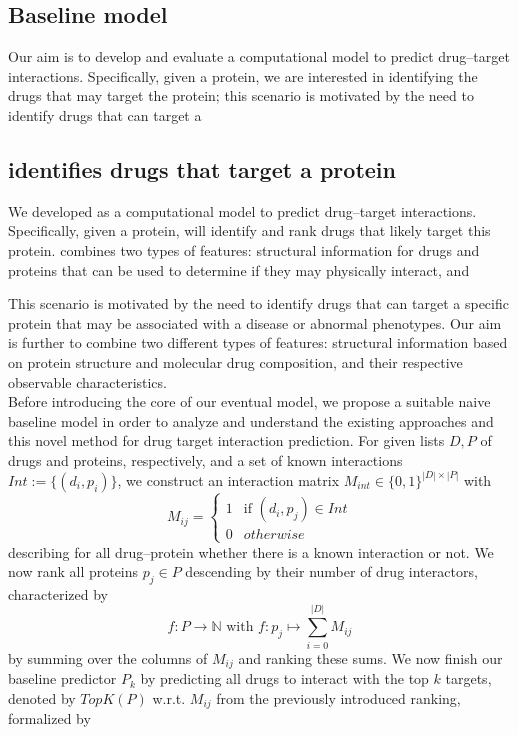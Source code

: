 \documentclass{bioinfo}
\begin{document}
\subsection{Baseline model}
Our aim is to develop and evaluate a computational model to predict
drug--target interactions. Specifically, given a protein, we are
interested in identifying the drugs that may target the protein; this
scenario is motivated by the need to identify drugs that can target a

\subsection{\name identifies drugs that target a protein}

We developed \name as a computational model to predict drug--target
interactions. Specifically, given a protein, \name will identify and
rank drugs that likely target this protein. \name combines two 
types of features: structural information for drugs and proteins that
can be used to determine if they may physically interact, and 

This scenario is motivated by the need to identify drugs that can target a
specific protein that may be associated with a disease or abnormal
phenotypes.
Our aim is further to combine two different types of features:
structural information based on protein structure and molecular drug composition, and their respective observable characteristics. \\

Before introducing the core of our eventual model, we propose a suitable naive baseline model in order to analyze and understand the existing approaches and this novel method for drug target interaction prediction. For given lists $D, P$ of drugs and proteins, respectively, and a set of known interactions $Int := \{(d_i, p_i) \}$, we construct an interaction matrix $M_{int}\in\{0,1\}^{|D|\times|P|}$ with 
\begin{equation*}
	M_{ij} = \begin{cases}
		1 & \text{if } (d_i, p_j)\in Int\\
		0 & otherwise
	\end{cases}
\end{equation*}
describing for all drug--protein whether there is a known interaction or not. We now rank all proteins $p_j\in P$ descending by their number of drug interactors, characterized by 
\begin{equation*}
	f: P \rightarrow \mathbb{N} \text{ with } f:p_j \mapsto \sum_{i=0}^{|D|}M_{ij}
\end{equation*}
by summing over the columns of $M_{ij}$ and ranking these sums.
We now finish our baseline predictor $P_k$ by predicting all drugs to interact with the top $k$ targets, denoted by $TopK(P)$ w.r.t. $M_{ij}$ from the previously introduced ranking, formalized by 
\end{document}
